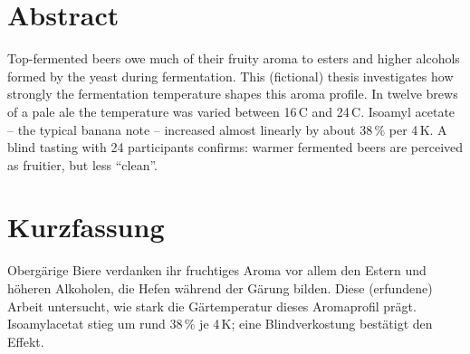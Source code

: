 \chapter*{Abstract}\label{cha:abstract}

Top-fermented beers owe much of their fruity aroma to esters and higher alcohols formed by the
yeast during fermentation. This (fictional) thesis investigates how strongly the fermentation
temperature shapes this aroma profile. In twelve brews of a pale ale the temperature was varied
between 16\,\textdegree{}C and 24\,\textdegree{}C. Isoamyl acetate -- the typical banana note --
increased almost linearly by about 38\,\% per 4\,K. A blind tasting with
24 participants confirms: warmer fermented beers are perceived as fruitier, but less ``clean''.

\chapter*{Kurzfassung}\label{cha:abstract_german}

Obergärige Biere verdanken ihr fruchtiges Aroma vor allem den Estern und
höheren Alkoholen, die Hefen während der Gärung bilden. Diese (erfundene) Arbeit untersucht, wie
stark die Gärtemperatur dieses Aromaprofil prägt. Isoamylacetat stieg um rund 38\,\% je
4\,K; eine Blindverkostung bestätigt den Effekt.

